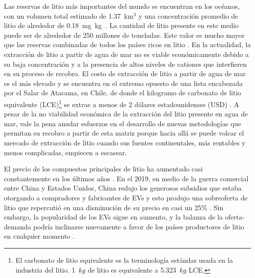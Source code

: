 Las reservas de litio más importantes del mundo se encuentran en los océanos, con un volumen total estimado de 1.37~km$^3$ y una concentración promedio de litio de alrededor de 0.18~mg~kg\mnn\ \citep{KRESS20191, Evans2013, HOSHINO201311}. La cantidad de litio presente en este medio puede ser de alrededor de 250 millones de toneladas. Este valor es mucho mayor que las reservas combinadas de todos los países ricos en litio \citep{Yang2018}. En la actualidad, la extracción de litio a partir de agua de mar no es viable económicamente debido a su baja concentración y a la presencia de altos niveles de cationes que interfieren en su proceso de recobro. El costo de extracción de litio a partir de agua de mar es el más elevado y se encuentra en el extremo opuesto de una lista encabezada por el Salar de Atacama, en Chile, de donde el kilogramo de carbonato de litio equivalente (LCE)\footnote{El carbonato de litio equivalente es la terminología estándar usada en la industria del litio. 1~$kg$ de litio es equivalente a 5.323~$kg$ LCE.} se extrae a menos de 2 dólares estadounidenses (USD) \citep{KUSHNIR2012}. A pesar de la no viabilidad económica de la extracción del litio presente en agua de mar, vale la pena anudar esfuerzos en el desarrollo de nuevas metodologías que permitan su recobro a partir de esta matriz porque hacia allá se puede volcar el mercado de extracción de litio cuando sus fuentes continentales, más rentables y menos complicadas, empiecen a escasear.

El precio de los compuestos principales de litio ha aumentado casi constantemente en los últimos años \citep{MARTIN2017}. En el 2019, en medio de la guerra comercial entre China y Estados Unidos, China redujo los generosos subsidios que estaba otorgando a compradores y fabricantes de \acp{EV} y esto produjo una sobreoferta de litio que repercutió en una disminución de su precio en casi un 25\% \citep{Kalantzakos2019}. Sin embargo, la popularidad de los \acp{EV} sigue en aumento, y la balanza de la oferta-demanda podría inclinarse nuevamente a favor de los países productores de litio en cualquier momento \citep{LIU2019}.



